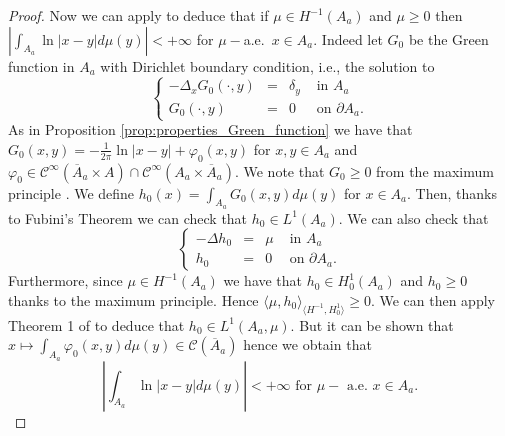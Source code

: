 \documentclass[12pt,reqno]{amsart}
\def\C{{\mathcal C}}
\def \p {\partial}
\numberwithin{equation}{section}
\begin{document}
\begin{proof}
Now we can apply \cite[Theorem 1]{Brezis_Browder_1979} to deduce that if \(\mu \in H^{-1}(A_a)\) and \(\mu \geq 0\) then
\(\left|\int_{A_a}\ln |x-y| d\mu (y)\right| <+\infty\) for \(\mu-\)a.e.\ \(x\in A_a\).
Indeed let \(G_0\) be the Green function in \(A_a\) with Dirichlet boundary condition, i.e., the solution to
\begin{equation*}
\left\{
\begin{array}{rcll}
-\Delta_xG_0(\cdot,y) &= & \delta_y & \text{ in } A_a \\
G_0(\cdot,y) &=& 0 & \text{ on } \p A_a.
\end{array}
\right.
\end{equation*} 
As in Proposition \ref{prop:properties_Green_function}  we have that \(G_0(x,y)=-\frac{1}{2\pi}\ln |x-y|+\varphi_0(x,y)\) for \(x,y\in A_a\) and \(\varphi_0\in \C^\infty(\overline{A}_a\times A)\cap \C^\infty(A_a\times \overline{A}_a)\). We note that \(G_0\geq 0\) from the maximum principle \cite[Proposition 6.1]{Ponce_2016}. We define \(h_0(x)=\int_{A_a}G_0(x,y) d \mu(y)\) for \(x\in A_a\). Then, thanks to Fubini's Theorem we can check that \(h_0 \in L^1(A_a)\). We can also check that
\begin{equation*}
\left\{
\begin{array}{rcll}
-\Delta h_0 &= & \mu & \text{ in } A_a \\
h_0 &=& 0 & \text{ on } \p A_a.
\end{array}
\right.
\end{equation*}
Furthermore, since \(\mu \in H^{-1}(A_a)\) we have that \(h_0\in H^1_0(A_a)\) and \( h_0\geq 0\) thanks to the maximum principle. Hence \( \langle \mu , h_0\rangle_{\langle H^{-1},H^1_0\rangle}\geq 0\). We can then apply Theorem 1 of \cite{Brezis_Browder_1979} to deduce that  \(h_0\in L^1(A_a,\mu)\). But it can be shown that \(x\mapsto \int_{A_a}\varphi_0(x,y) d\mu(y)\in \C(\overline{A}_a)\) hence we obtain that 
\begin{equation}\label{eq:Browder1}
\left| \int_{A_a}\ln |x-y| d \mu(y) \right| <+\infty \text{ for } \mu-\text{ a.e. } x\in A_a.
\end{equation} 


\end{proof}
\end{document}
